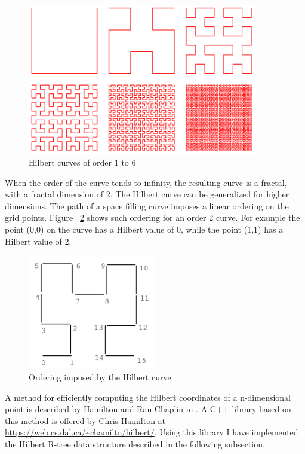 \documentclass[11pt, a4paper, oneside]{article}
\begin{document}
\begin{figure}[h!]
  \caption{Hilbert curves of order 1 to 6}
  \label{fig:hilbert}
  \centering
    \includegraphics[width=0.9\textwidth]{img/Hilbert6}
\end{figure}

When the order of the curve tends to infinity, the resulting curve is a fractal, with a fractal dimension of 2. The Hilbert curve can be generalized for higher dimensions. The path of a space filling curve imposes a linear ordering on the grid points. Figure ~\ref{fig:hilbert-ordering} shows such ordering for an order 2 curve. For example the point (0,0) on the curve has a Hilbert value of 0, while the point (1,1) has a Hilbert value of 2. 

\begin{figure}[h!]
  \caption{Ordering imposed by the Hilbert curve {\cite{Kamel:1994:HRI:645920.673001}} }
  \label{fig:hilbert-ordering}
  \centering
    \includegraphics[width=0.5\textwidth]{img/HilbertOrdering}
\end{figure}


A method for efficiently computing the Hilbert coordinates of a n-dimensional point is described by Hamilton and Rau-Chaplin in \cite{Hamilton:2008:CHI:1330769.1330914}. A C++ library based on this method is offered by Chris Hamilton at \url{https://web.cs.dal.ca/~chamilto/hilbert/}. Using this library I have implemented the Hilbert R-tree data structure described in the following subsection.
\end{document}
